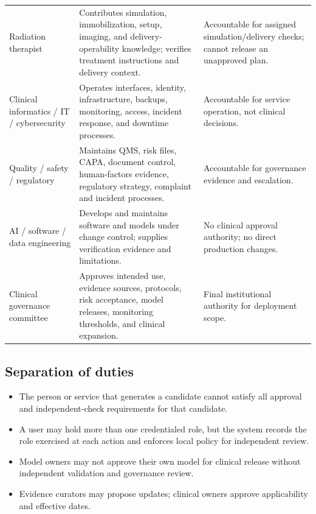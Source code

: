 \documentclass[11pt,letterpaper]{article}
\begin{document}
\begin{small}
\begin{longtable}{@{}L{0.1474\textwidth}L{0.4777\textwidth}L{0.2949\textwidth}@{}}
\addlinespace[2pt]
Radiation therapist & Contributes simulation, immobilization, setup, imaging, and delivery-operability knowledge; verifies treatment instructions and delivery context. & Accountable for assigned simulation\slash\allowbreak{}delivery checks; cannot release an unapproved plan. \\
\addlinespace[2pt]
Clinical informatics \slash\allowbreak{} IT \slash\allowbreak{} cybersecurity & Operates interfaces, identity, infrastructure, backups, monitoring, access, incident response, and downtime processes. & Accountable for service operation, not clinical decisions. \\
\addlinespace[2pt]
Quality \slash\allowbreak{} safety \slash\allowbreak{} regulatory & Maintains QMS, risk files, CAPA, document control, human-factors evidence, regulatory strategy, complaint and incident processes. & Accountable for governance evidence and escalation. \\
\addlinespace[2pt]
AI \slash\allowbreak{} software \slash\allowbreak{} data engineering & Develops and maintains software and models under change control; supplies verification evidence and limitations. & No clinical approval authority; no direct production changes. \\
\addlinespace[2pt]
Clinical governance committee & Approves intended use, evidence sources, protocols, risk acceptance, model releases, monitoring thresholds, and clinical expansion. & Final institutional authority for deployment scope. \\
\end{longtable}
\end{small}

\subsection{Separation of duties}

\begin{itemize}
\item The person or service that generates a candidate cannot satisfy all approval and independent-check requirements for that candidate.
\item A user may hold more than one credentialed role, but the system records the role exercised at each action and enforces local policy for independent review.
\item Model owners may not approve their own model for clinical release without independent validation and governance review.
\item Evidence curators may propose updates; clinical owners approve applicability and effective dates.
\end{itemize}
\end{document}
